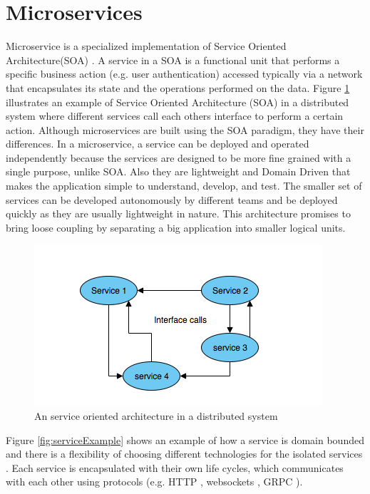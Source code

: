 \section{Microservices}

Microservice is a specialized implementation of Service Oriented Architecture(SOA) \cite[chapter ~3]{SOA}. A service in a SOA
is a functional unit that performs a specific business action (e.g. user authentication) accessed typically via a network that 
encapsulates its state and the operations performed on the data.  
Figure \ref{fig:objectBasedDS} illustrates an example of Service Oriented Architecture (SOA) in a distributed system where different services call each others interface
to perform a certain action. Although microservices are built using the SOA paradigm, they have their differences. In a microservice, a service can be deployed and 
operated independently because the services are designed to be more fine grained with a single purpose, unlike SOA. 
Also they are lightweight and Domain Driven \cite{DDD} that makes the application simple to understand, develop, and test. The smaller set of services
can be developed autonomously by different teams and be deployed quickly as they are usually lightweight in nature. This architecture promises to bring loose coupling 
by separating a big application into smaller logical units. 


\begin{figure}[H]
    \centering \includegraphics[scale=0.7]{grafiken/objectBasedDS.png}
    \caption{An service oriented architecture in a distributed system 
        \cite[p.~62]{DistributedSystems}}
    \label{fig:objectBasedDS}
\end{figure}


Figure \ref{fig:serviceExample} shows an example of how 
a service is domain bounded and there is a flexibility of choosing different
technologies for the isolated services \cite{MicroserviceNewMan}. 
Each service is encapsulated with their own life cycles, which communicates with each other using protocols 
(e.g. HTTP \cite{HTTP}, websockets \cite{WebSockets}, GRPC \cite{grpc}). 

